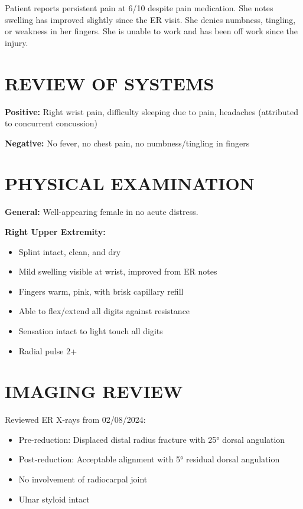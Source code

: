 \documentclass[11pt]{article}
\begin{document}
Patient reports persistent pain at 6/10 despite pain medication. She notes swelling has improved slightly since the ER visit. She denies numbness, tingling, or weakness in her fingers. She is unable to work and has been off work since the injury.

\section*{REVIEW OF SYSTEMS}

\textbf{Positive:} Right wrist pain, difficulty sleeping due to pain, headaches (attributed to concurrent concussion)

\textbf{Negative:} No fever, no chest pain, no numbness/tingling in fingers

\section*{PHYSICAL EXAMINATION}

\textbf{General:} Well-appearing female in no acute distress.

\textbf{Right Upper Extremity:}
\begin{itemize}[nosep]
\item Splint intact, clean, and dry
\item Mild swelling visible at wrist, improved from ER notes
\item Fingers warm, pink, with brisk capillary refill
\item Able to flex/extend all digits against resistance
\item Sensation intact to light touch all digits
\item Radial pulse 2+
\end{itemize}

\section*{IMAGING REVIEW}

Reviewed ER X-rays from 02/08/2024:
\begin{itemize}[nosep]
\item Pre-reduction: Displaced distal radius fracture with 25° dorsal angulation
\item Post-reduction: Acceptable alignment with 5° residual dorsal angulation
\item No involvement of radiocarpal joint
\item Ulnar styloid intact
\end{itemize}
\end{document}
